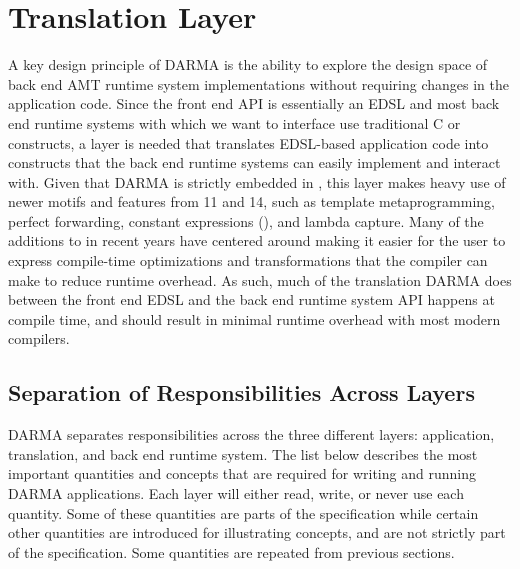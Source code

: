 
\chapter{Translation Layer}
\label{chap:translation_layer}

A key design principle of \gls{DARMA} is the ability to explore the design space of
\gls{back end} \gls{AMT} \gls{runtime system} implementations without requiring changes in the application
code.  Since the \gls{front end} \gls{API} is essentially an \gls{EDSL}
and most \gls{back end} \glspl{runtime system} with which we want to interface
use traditional C or \CC{}
constructs, a layer is needed that translates \gls{EDSL}-based application code into
\CC{} constructs that the \gls{back end} \glspl{runtime system} can easily implement and interact with.  Given
that \gls{DARMA} is strictly embedded in \CC{}, this layer makes heavy use of
newer \CC{} motifs and features from \CC{}11 and \CC{}14, such as \gls{template
metaprogramming}, \gls{perfect forwarding}, constant expressions
(), and \gls{lambda} \gls{capture}.  Many of the
additions to \CC{} in recent years have centered around
making it easier for the user to express compile-time optimizations and
transformations that the compiler can make to reduce runtime overhead.  As such,
much of the translation \gls{DARMA} does between the \gls{front end} \gls{EDSL}
and the \gls{back end} \gls{runtime system} \gls{API}
happens at compile time, and should result in minimal runtime overhead with most
modern compilers.

\section{Separation of Responsibilities Across Layers}
\gls{DARMA} separates responsibilities across the three different layers:
application, translation, and \gls{back end} \gls{runtime system}.
The list below describes the most important quantities and concepts that are
required for writing and running \gls{DARMA} applications.
Each layer will either read, write, or never use each quantity.  
Some of these quantities are parts of the specification while certain other quantities 
are introduced for illustrating concepts, and are not strictly part of the specification.
Some quantities are repeated from previous sections.

